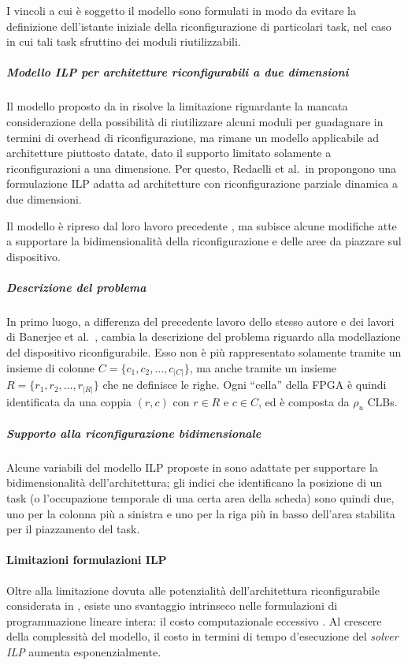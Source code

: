 I vincoli a cui è soggetto il modello sono formulati in modo da evitare la 
definizione dell'istante iniziale della riconfigurazione di particolari task, 
nel caso in cui tali task sfruttino dei moduli riutilizzabili.

\subparagraph{Modello \acs{ILP} per architetture riconfigurabili a due 
dimensioni}
Il modello proposto da in \cite{Redaelli1DILP} risolve la limitazione 
riguardante la mancata considerazione della possibilità di riutilizzare alcuni 
moduli per guadagnare in termini di overhead di riconfigurazione, ma rimane un 
modello applicabile ad architetture piuttosto datate, dato il supporto limitato
solamente a riconfigurazioni a una dimensione. Per questo, Redaelli et al.~in 
\cite{Redaelli2DILP} propongono una formulazione \ac{ILP} adatta ad 
architetture con riconfigurazione parziale dinamica a due dimensioni.

Il modello è ripreso dal loro lavoro precedente \cite{Redaelli1DILP}, ma 
subisce alcune modifiche atte a supportare la bidimensionalità della 
riconfigurazione e delle aree da piazzare sul dispositivo.

\subparagraph{Descrizione del problema}
In primo luogo, a differenza del precedente lavoro dello stesso autore e 
dei lavori di Banerjee et al.~, cambia la descrizione del problema riguardo alla 
modellazione del dispositivo riconfigurabile. Esso non è più rappresentato 
solamente tramite un insieme di colonne $C = \{c_1,c_2,\dots,c_{\vert C 
\vert}\}$, ma anche tramite un insieme $R = \{r_1,r_2,\dots,r_{\vert R \vert}\}$ 
che ne definisce le righe. Ogni ``cella'' della \ac{FPGA} è quindi identificata 
da una coppia $(r,c)$ con $r \in R$ e $c \in C$, ed è composta da $\rho_u$ 
\acp{CLB}.

\subparagraph{Supporto alla riconfigurazione bidimensionale}
Alcune variabili del modello \ac{ILP} proposte in \cite{Redaelli1DILP} sono 
adattate per supportare la bidimensionalità dell'architettura; gli indici che 
identificano la posizione di un task (o l'occupazione temporale di una certa 
area della scheda) sono quindi due, uno per la colonna più a sinistra e uno per 
la riga più in basso dell'area stabilita per il piazzamento del task.


\paragraph{Limitazioni formulazioni \acs{ILP}}
Oltre alla limitazione dovuta alle potenzialità dell'architettura 
riconfigurabile considerata in \cite{BanerjeePhysicalConstraints}, esiste uno 
svantaggio intrinseco nelle formulazioni di programmazione lineare intera: il 
costo computazionale eccessivo \cite{CombinatorialOptimizationComplexity}. Al
crescere della complessità del modello, il costo in termini di tempo d'esecuzione
del \emph{solver \ac{ILP}} aumenta esponenzialmente.


